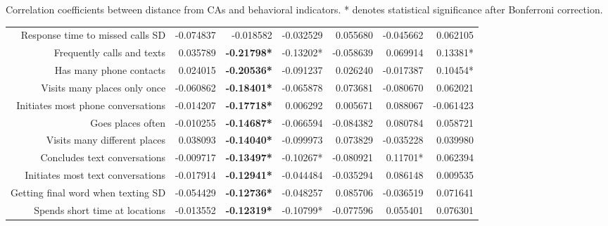 Correlation coefficients between distance from CAs and behavioral indicators. * denotes statistical significance after Bonferroni correction.\\


\newcommand{\mcc}[1]{\multicolumn{1}{R{1.5cm}}{#1}}

{
\footnotesize
\hspace{-2cm}
\begin{tabular}{rrrrrrr}
\toprule
{} &         							  \mcc{\achiever} 		& \mcc{\host} 			& \mcc{\wildcard} 		& \mcc{\loyalist} 		& \mcc{\hippie} 		& \mcc{\follower} 	\\
\midrule
Response time to missed calls SD 		& -0.074837				& -0.018582 			& -0.032529 			&  0.055680 			& -0.045662 			&  0.062105 		\\
Frequently calls and texts              &  0.035789				& \textbf{-0.21798*} 	& -0.13202* 			& -0.058639 			&  0.069914 			&  0.13381* 		\\
Has many phone contacts                 &  0.024015				& \textbf{-0.20536*} 	& -0.091237 			&  0.026240 			& -0.017387 			&  0.10454* 		\\
Visits many places only once            & -0.060862				& \textbf{-0.18401*} 	& -0.065878 			&  0.073681 			& -0.080670 			&  0.062021 		\\
Initiates most phone conversations      & -0.014207				& \textbf{-0.17718*} 	&  0.006292 			&  0.005671 			&  0.088067 			& -0.061423 		\\
Goes places often                       & -0.010255				& \textbf{-0.14687*} 	& -0.066594 			& -0.084382 			&  0.080784 			&  0.058721 		\\
Visits many different places            &  0.038093				& \textbf{-0.14040*} 	& -0.099973 			&  0.073829 			& -0.035228 			&  0.039980 		\\
Concludes text conversations            & -0.009717				& \textbf{-0.13497*} 	& -0.10267* 			& -0.080921 			&  0.11701* 			&  0.062394 		\\
Initiates most text conversations       & -0.017914				& \textbf{-0.12941*} 	& -0.044484 			& -0.035294 			&  0.086148 			&  0.009535 		\\
Getting final word when texting SD 		& -0.054429				& \textbf{-0.12736*} 	& -0.048257 			&  0.085706 			& -0.036519 			&  0.071641 		\\
Spends short time at locations          & -0.013552				& \textbf{-0.12319*} 	& -0.10799* 			& -0.077596 			&  0.055401 			&  0.076301 		\\

\end{tabular}}
